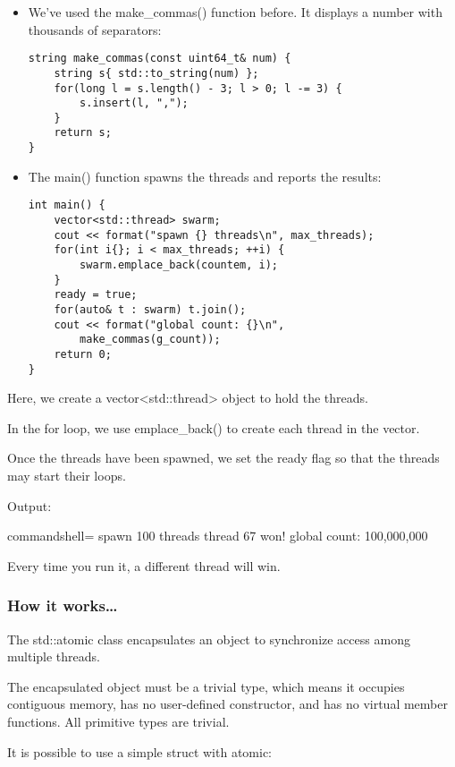 \begin{itemize}
\item 
We've used the make\_commas() function before. It displays a number with thousands of separators:

\begin{lstlisting}[style=styleCXX]
string make_commas(const uint64_t& num) {
	string s{ std::to_string(num) };
	for(long l = s.length() - 3; l > 0; l -= 3) {
		s.insert(l, ",");
	}
	return s;
}
\end{lstlisting}

\item 
The main() function spawns the threads and reports the results:

\begin{lstlisting}[style=styleCXX]
int main() {
	vector<std::thread> swarm;
	cout << format("spawn {} threads\n", max_threads);
	for(int i{}; i < max_threads; ++i) {
		swarm.emplace_back(countem, i);
	}
	ready = true;
	for(auto& t : swarm) t.join();
	cout << format("global count: {}\n",
		make_commas(g_count));
	return 0;
}
\end{lstlisting}

\end{itemize}

Here, we create a vector<std::thread> object to hold the threads.

In the for loop, we use emplace\_back() to create each thread in the vector.

Once the threads have been spawned, we set the ready flag so that the threads may start their loops.

Output:

\begin{tcblisting}{commandshell={}}
spawn 100 threads
thread 67 won!
global count: 100,000,000
\end{tcblisting}

Every time you run it, a different thread will win.

\subsubsection{How it works…}

The std::atomic class encapsulates an object to synchronize access among multiple threads.

The encapsulated object must be a trivial type, which means it occupies contiguous memory, has no user-defined constructor, and has no virtual member functions.
All primitive types are trivial.

It is possible to use a simple struct with atomic:

